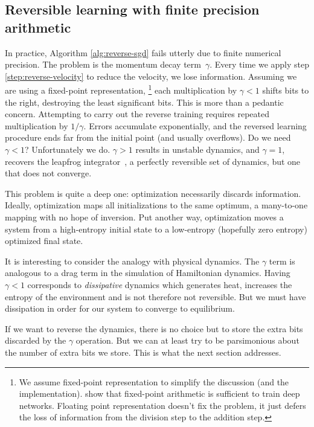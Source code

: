 \documentclass{article}
\newcommand{\decay}{\gamma}
\begin{document}
\subsection{Reversible learning with finite precision arithmetic}

In practice, Algorithm \ref{alg:reverse-sgd} fails utterly due to finite
numerical precision. The problem is the momentum decay term~$\decay$.
Every time we apply step \ref{step:reverse-velocity} to reduce the velocity, we
lose information. Assuming we are using a fixed-point representation,
\footnote{We assume fixed-point representation to simplify the discussion (and
  the implementation). 
  \citet{courbariaux2014low} show that fixed-point arithmetic is sufficient to train deep networks.
  Floating point representation doesn't fix the problem, it
  just defers the loss of information from the division step to the addition step.}
each multiplication by $\decay < 1$ shifts bits to the right, destroying the
least significant bits. This is more than a pedantic concern. Attempting to
carry out the reverse training requires repeated multiplication by $1/\decay$. 
Errors accumulate exponentially, and the reversed learning procedure ends far
from the initial point (and usually overflows). Do we need $\decay < 1$?
Unfortunately we do. $\decay > 1$ results in unstable dynamics, and
$\decay = 1$, recovers the leapfrog integrator~\citep{leapfrog1995}, a perfectly reversible set of dynamics, but one that does not converge.

This problem is quite a deep one: optimization necessarily discards information.
Ideally, optimization maps all initializations to the same optimum,
a many-to-one mapping with no hope of inversion.
Put another way, optimization moves a system from a high-entropy initial state
to a low-entropy (hopefully zero entropy) optimized final state.

It is interesting to consider the analogy with physical dynamics. The $\decay$
term is analogous to a drag term in the simulation of Hamiltonian dynamics.
Having $\decay < 1$ corresponds to \emph{dissipative} dynamics which generates
heat, increases the entropy of the environment and is not therefore not
reversible. But we must have dissipation in order for our system to converge to equilibrium.

If we want to reverse the dynamics, there is no choice but to store the extra
bits discarded by the $\decay$ operation. But we can at least try to
be parsimonious about the number of extra bits we store. This is what the next
section addresses.
\end{document}
